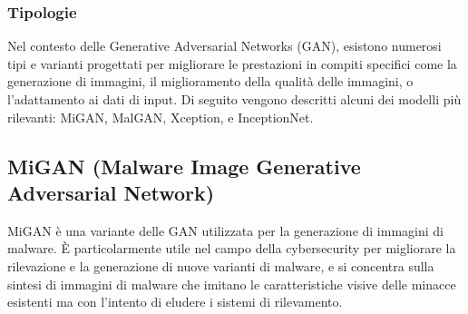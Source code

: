 \subsubsection{Tipologie}
Nel contesto delle Generative Adversarial Networks (GAN), esistono numerosi tipi e varianti progettati per migliorare le prestazioni in compiti specifici come la generazione di immagini, il miglioramento della qualità delle immagini, o l'adattamento ai dati di input. Di seguito vengono descritti alcuni dei modelli più rilevanti: MiGAN, MalGAN, Xception, e InceptionNet.

\subsection{MiGAN (Malware Image Generative Adversarial Network)}

MiGAN è una variante delle GAN utilizzata per la generazione di immagini di malware. È particolarmente utile nel campo della cybersecurity per migliorare la rilevazione e la generazione di nuove varianti di malware, e si concentra sulla sintesi di immagini di malware che imitano le caratteristiche visive delle minacce esistenti ma con l'intento di eludere i sistemi di rilevamento.

